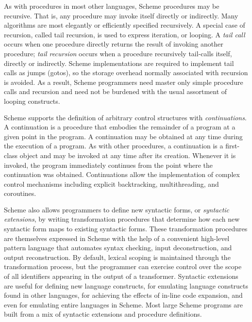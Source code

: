 As with procedures in most other languages, Scheme procedures may
be recursive.
That is, any procedure may invoke itself directly or indirectly.
Many algorithms are most elegantly or efficiently specified recursively.
A special case of \label{intro_s19}recursion, called \label{intro_s20}tail recursion, is used to
express \label{intro_s21}iteration, or \label{intro_s22}looping.
A \label{intro_s23}\textit{tail call} occurs when one procedure directly returns the result of
invoking another procedure; \textit{tail recursion} occurs when
a procedure recursively tail-calls itself, directly or indirectly.
Scheme implementations are required to implement tail calls as
jumps (gotos), so the storage overhead normally associated with recursion
is avoided.
As a result, Scheme programmers need master only simple procedure calls
and recursion and need not be burdened with the usual assortment
of looping constructs.


Scheme supports the definition of arbitrary control structures with
\label{intro_s24}\textit{continuations}.
A continuation is a procedure that embodies the remainder of a program
at a given point in the program.
A continuation may be obtained at any time during the execution of a
program.
As with other procedures, a continuation is a first-class object and
may be invoked at any time after its creation.
Whenever it is invoked, the program immediately continues from the
point where the continuation was obtained.
Continuations allow the implementation of complex control mechanisms
including explicit backtracking, multithreading, and coroutines.


\label{intro_s25}Scheme also allows programmers to define new syntactic forms, or
\textit{syntactic extensions}, by writing transformation procedures that
determine how each new syntactic form maps to existing syntactic forms.
These transformation procedures are themselves expressed in Scheme
with the help of a convenient high-level pattern language that automates
syntax checking, input deconstruction, and output reconstruction.
By default, lexical scoping is maintained through the transformation
process, but the programmer can exercise control over the scope of all
identifiers appearing in the output of a transformer.
Syntactic extensions are useful for defining new language constructs,
for emulating language constructs found in other languages, for
achieving the effects of in-line code expansion, and even for
emulating entire languages in Scheme.
Most large Scheme programs are built from a mix of
syntactic extensions and procedure definitions.


